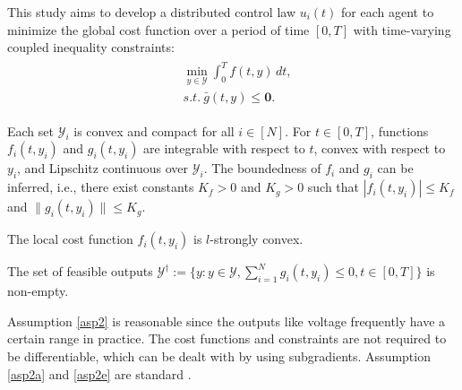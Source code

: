 \documentclass[final,5p,times,twocolumn,authoryear]{elsarticle}
\begin{document}
	This study aims to develop a distributed control law $u_i(t)$ for each agent to minimize the global cost function over a period of time $[0,T]$ with time-varying coupled inequality constraints:
	\begin{align}
		\begin{split}
			&\min_{y \in \mathcal{Y}} \int_{0}^{T}f(t,y)\,dt ,\\
			&s.t.~\bar g(t,y)\le \boldsymbol0.\label{question2}
		\end{split}
	\end{align}

	
	
	\begin{assumption} \label{asp2}
		Each set $\mathcal{Y}_i$ is convex and compact for all $i\in[N]$. For $t\in [0,T]$, functions $f_i(t,y_i)$ and $g_i(t,y_i)$ are  integrable with respect to $t$, convex with respect to $y_i$,  and Lipschitz continuous over $\mathcal{Y}_i$. The boundedness of $f_i$ and $g_i$ can be inferred, i.e., there exist constants $K_f>0$ and $K_g>0$ such that $|f_i(t,y_i)|\le K_f$ and $\|g_i(t,y_i)\|\le K_g$.
	\end{assumption}
	
	\begin{assumption}\label{asp2a}
		The local cost function $f_i(t,y_i)$ is $l$-strongly convex.
	\end{assumption}
	
	\begin{assumption}\label{asp2e}
		The set of feasible outputs $\mathcal{Y}^\dagger:=\{y: y\in\mathcal{Y}, \sum_{i=1}^{N}g_{i}(t, y_i)\le 0, t\in[0,T]\}$ is non-empty.
	\end{assumption}
	
		
	
	\begin{remark}
		 Assumption \ref{asp2} is reasonable since the outputs like voltage frequently have a certain range in practice. The cost functions and constraints are not required to be differentiable, which can be dealt with by using subgradients. Assumption \ref{asp2a} and \ref{asp2e} are standard \citep{yi2020,pater2020}.
	\end{remark}
\end{document}
